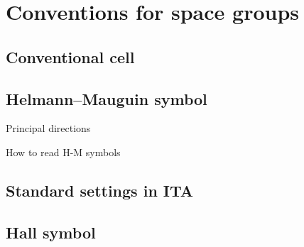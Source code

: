 \section{\label{sec:convention}Conventions for space groups}

\subsection{Conventional cell}

\subsection{Helmann--Mauguin symbol}

Principal directions

How to read H-M symbols

\subsection{Standard settings in ITA}

\subsection{Hall symbol}
